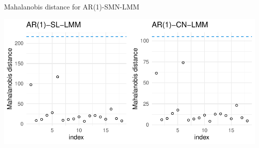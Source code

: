 \begin{frame}[fragile]{Mahalanobis distance for AR(1)-SMN-LMM}
\protect\hypertarget{mahalanobis-distance-for-ar1-smn-lmm}{}

\scriptsize

\begin{Shaded}
\begin{Highlighting}[]
\NormalTok{(}\NormalTok{(} \NormalTok{)}\OperatorTok{+}
\StringTok{               }\NormalTok{(}\NormalTok{),}
             \NormalTok{(} \NormalTok{)}\OperatorTok{+}
\StringTok{               }\NormalTok{(}\NormalTok{),} \NormalTok{)}
\end{Highlighting}
\end{Shaded}

\begin{center}\includegraphics[width=0.8\linewidth]{codes_files/figure-beamer/mahal1-1} \end{center}

\end{frame}

